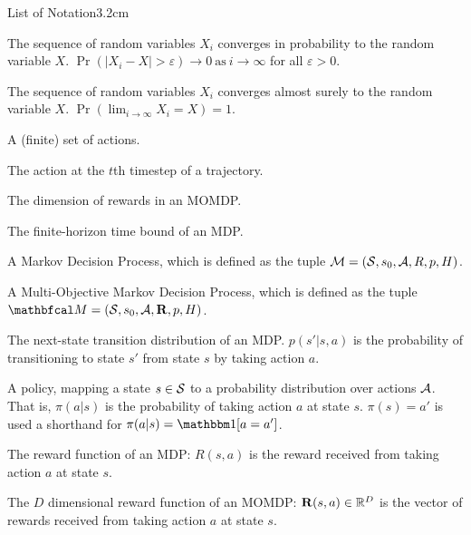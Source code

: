 \begin{mclistof}{List of Notation}{3.2cm}
    \item[$X_i\rap X$]
        The sequence of random variables $X_i$ converges in probability to the random variable $X$. $\Pr\left(\left|X_i - X\right| > \varepsilon\right) \rightarrow 0 \ \text{as} \ i \rightarrow \infty$ for all $\varepsilon>0$.
    \item[$X_i\raas X$]
        The sequence of random variables $X_i$ converges almost surely to the random variable $X$. $\Pr\left(\lim_{i\rightarrow\infty} X_i = X\right) = 1$. %
    \\
    \item[$\cl{A}$]
        A (finite) set of actions.
    \item[$a_t$]
        The action at the $t$th timestep of a trajectory.
    \item[$D$]
        The dimension of rewards in an MOMDP.
    \item[$H$]
        The finite-horizon time bound of an MDP.
    \item[$\cl{M}$]
        \begin{sloppypar} A Markov Decision Process, which is defined as the tuple \mbox{$\mathcal{M}=(\mathcal{S},s_0,\mathcal{A},R,p,H)$}. \end{sloppypar}
    \item[$\bfcl{M}$] 
        A Multi-Objective Markov Decision Process, which is defined as the tuple $\bfcl{M}=(\cl{S},s_0,\cl{A},\bff{R},p,H)$.
    \item[$p$] 
        The next-state transition distribution of an MDP. $p(s' | s,a)$ is the probability of transitioning to state $s'$ from state $s$ by taking action $a$.
    \item[$\pi$]
        A policy, mapping a state $s\in\mathcal{S}$ to a probability distribution over actions $\cl{A}$. That is, $\pi(a|s)$ is the probability of taking action $a$ at state $s$. $\pi(s)=a'$ is used a shorthand for $\pi(a|s)=\one[a=a']$.
    \item[$R$] 
        The reward function of an MDP: $R(s,a)$ is the reward received from taking action $a$ at state $s$.
    \item[$\bff{R}$] 
        The $D$ dimensional reward function of an MOMDP: $\mathbf{R}(s,a)\in\mathbb{R}^D$ is the vector of rewards received from taking action $a$ at state $s$.
    \item[$r_t$]

\end{mclistof}

